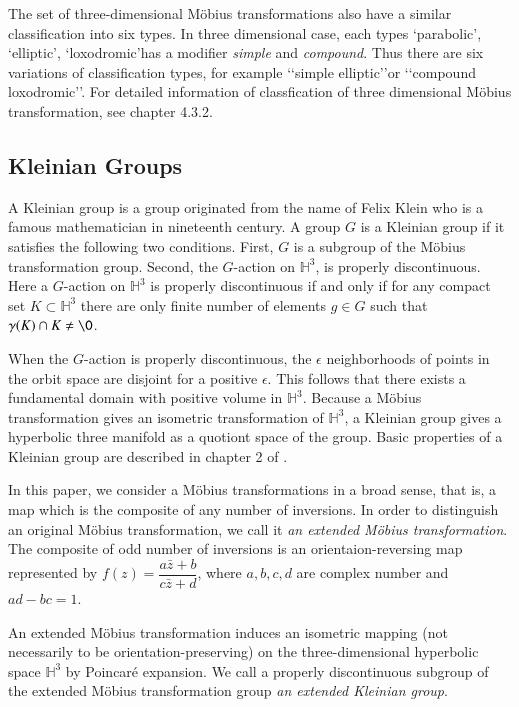 The set of three-dimensional M\"obius transformations also have a similar
classification into six types.
In three dimensional case, each types \lq parabolic\rq, \lq elliptic\rq, \lq loxodromic\rq has 
a modifier \textit{simple} and \textit{compound}.
Thus there are six variations of classification types, for example \lq\lq simple elliptic\rq\rq or
\lq\lq compound loxodromic\rq\rq.
For detailed information of classfication of three dimensional M\"obius transformation, see chapter 4.3.2.

\subsection{Kleinian Groups}

A Kleinian group is a group originated from the name of Felix Klein who is
a famous mathematician in nineteenth century.
A group $G$ is a Kleinian group if it satisfies the following two
conditions. 
First, $G$ is a subgroup of the M\"obius transformation group.
Second, the $G$-action on $\mathbb{H}^3$,
is properly discontinuous.
Here a $G$-action on $\mathbb{H}^3$
is properly discontinuous if and only if
for any compact set $K \subset \mathbb{H}^3$
there are only finite number of elements $g \in G$ such that
$\gamma (K) \cap K \neq \O$.

When the $G$-action is properly discontinuous, 
the $\epsilon$ neighborhoods of points in the orbit space are disjoint
for a positive $\epsilon$.
This follows that there exists a
fundamental domain with positive volume in $\mathbb{H}^3$.
Because a M\"obius transformation gives an isometric transformation of
$\mathbb{H}^3$, a Kleinian group gives a hyperbolic three manifold 
as a quotiont space of the group. 
Basic properties of a Kleinian group are described in chapter 2 of \cite{marden_2016}.

In this paper, we consider a M\"obius transformations in a broad sense, that is,
a map which is the composite of
any number of inversions.
In order to distinguish an original M\"obius transformation,
we call it \textit{an extended M\"obius transformation}.
The composite of odd number of inversions
is an orientaion-reversing map represented by $f(z)=\dfrac{a{\bar{z}}+b}{c{\bar{z}}+d}$, where
$a, b, c, d$ are complex number and $ad-bc = 1$.

An extended M\"obius transformation induces an isometric mapping 
(not necessarily to be orientation-preserving) on the three-dimensional hyperbolic space $\mathbb{H}^3$ by
Poincar\'e expansion.
We call a properly discontinuous subgroup of the extended M\"obius transformation group
\textit{an extended Kleinian group}.

